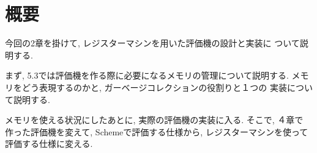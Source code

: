 
%
\author{Daniel Perez}
%

\maketitle
%
\section*{概要}
今回の2章を掛けて, レジスターマシンを用いた評価機の設計と実装に%
ついて説明する.

まず, 5.3では評価機を作る際に必要になるメモリの管理について説明する.
メモリをどう表現するのかと, ガーベージコレクションの役割りと１つの%
実装について説明する.

メモリを使える状況にしたあとに, 実際の評価機の実装に入る. そこで, ４章で%
作った評価機を変えて, Schemeで評価する仕様から, レジスターマシンを使って%
評価する仕様に変える.
%

%

